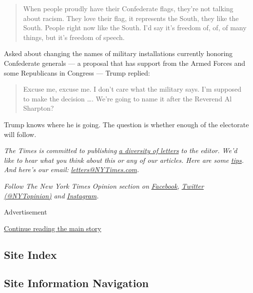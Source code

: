 \begin{quote}
When people proudly have their Confederate flags, they're not talking
about racism. They love their flag, it represents the South, they like
the South. People right now like the South. I'd say it's freedom of, of,
of many things, but it's freedom of speech.
\end{quote}

Asked about changing the names of military installations currently
honoring Confederate generals --- a proposal that has support from the
Armed Forces and some Republicans in Congress --- Trump replied:

\begin{quote}
Excuse me, excuse me. I don't care what the military says. I'm supposed
to make the decision \ldots{}. We're going to name it after the Reverend
Al Sharpton?
\end{quote}

Trump knows where he is going. The question is whether enough of the
electorate will follow.

\emph{The Times is committed to publishing}
\href{https://www.nytimes3xbfgragh.onion/2019/01/31/opinion/letters/letters-to-editor-new-york-times-women.html}{\emph{a
diversity of letters}} \emph{to the editor. We'd like to hear what you
think about this or any of our articles. Here are some}
\href{https://help.nytimes3xbfgragh.onion/hc/en-us/articles/115014925288-How-to-submit-a-letter-to-the-editor}{\emph{tips}}\emph{.
And here's our email:}
\href{mailto:letters@NYTimes.com}{\emph{letters@NYTimes.com}}\emph{.}

\emph{Follow The New York Times Opinion section on}
\href{https://www.facebookcorewwwi.onion/nytopinion}{\emph{Facebook}}\emph{,}
\href{http://twitter.com/NYTOpinion}{\emph{Twitter (@NYTopinion)}}
\emph{and}
\href{https://www.instagram.com/nytopinion/}{\emph{Instagram}}\emph{.}

Advertisement

\protect\hyperlink{after-bottom}{Continue reading the main story}

\hypertarget{site-index}{%
\subsection{Site Index}\label{site-index}}

\hypertarget{site-information-navigation}{%
\subsection{Site Information
Navigation}\label{site-information-navigation}}

